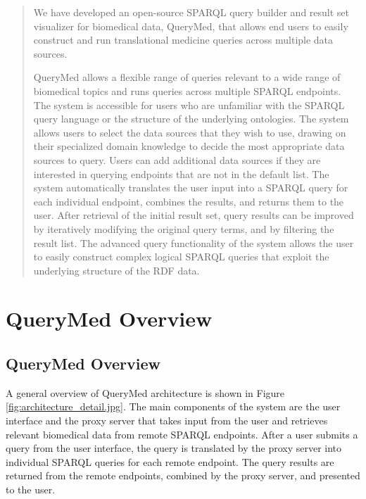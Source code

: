 \documentclass{www2010-submission}
\begin{document}
\maketitle
\begin{abstract}
We have developed an open-source SPARQL query builder and result set visualizer for biomedical data, QueryMed, that allows end users to easily construct and run translational medicine queries across multiple data sources. 
\smallskip

QueryMed allows a flexible range of queries relevant to a wide range of biomedical topics and runs queries across multiple SPARQL endpoints.  The system is accessible for users who are unfamiliar with the SPARQL query language or the structure of the underlying ontologies. The system allows users to select the data sources that they wish to use, drawing on their specialized domain knowledge to decide the most appropriate data sources to query.  Users can add additional data sources if they are interested in querying endpoints that are not in the default list. The system automatically translates the user input into a SPARQL query for each individual endpoint, combines the results, and returns them to the user. After retrieval of the initial result set, query results can be improved  by iteratively modifying the original query terms, and by filtering the result list.  The advanced query functionality of the system allows the user to easily construct complex logical SPARQL queries that exploit the underlying structure of the RDF data. 
\end{abstract}


\label{system}

\section{QueryMed Overview}

\smallskip

\subsection{QueryMed Overview}


A general overview of QueryMed architecture is shown in Figure \ref{fig:architecture_detail.jpg}. The main components of the system are the user interface and the proxy server that takes input from the user and retrieves relevant biomedical data from remote SPARQL endpoints.   After a user submits a query from the user interface, the query is translated by the proxy server into individual SPARQL queries for each remote endpoint.  The query results are returned from the remote endpoints, combined by the proxy server, and presented to the user.   
\end{document}
